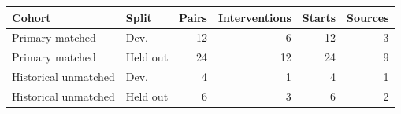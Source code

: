 \begin{tabular}{llrrrr}\toprule
Cohort & Split & Pairs & Interventions & Starts & Sources\\\midrule
Primary matched & Dev. & 12 & 6 & 12 & 3\\
Primary matched & Held out & 24 & 12 & 24 & 9\\
Historical unmatched & Dev. & 4 & 1 & 4 & 1\\
Historical unmatched & Held out & 6 & 3 & 6 & 2\\
\bottomrule\end{tabular}

